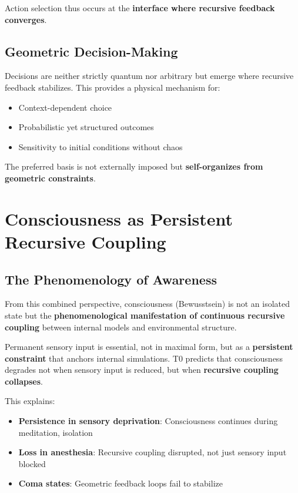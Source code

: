 	Action selection thus occurs at the \textbf{interface where recursive feedback converges}.
	
	\subsection{Geometric Decision-Making}
	
	Decisions are neither strictly quantum nor arbitrary but emerge where recursive feedback stabilizes. This provides a physical mechanism for:
	
	\begin{itemize}
		\item Context-dependent choice
		\item Probabilistic yet structured outcomes
		\item Sensitivity to initial conditions without chaos
	\end{itemize}
	
	The preferred basis is not externally imposed but \textbf{self-organizes from geometric constraints}.
	
	\section{Consciousness as Persistent Recursive Coupling}
	
	\subsection{The Phenomenology of Awareness}
	
	From this combined perspective, consciousness (Bewusstsein) is not an isolated state but the \textbf{phenomenological manifestation of continuous recursive coupling} between internal models and environmental structure.
	
	Permanent sensory input is essential, not in maximal form, but as a \textbf{persistent constraint} that anchors internal simulations. T0 predicts that consciousness degrades not when sensory input is reduced, but when \textbf{recursive coupling collapses}.
	
	This explains:
	\begin{itemize}
		\item \textbf{Persistence in sensory deprivation}: Consciousness continues during meditation, isolation
		\item \textbf{Loss in anesthesia}: Recursive coupling disrupted, not just sensory input blocked
		\item \textbf{Coma states}: Geometric feedback loops fail to stabilize
	\end{itemize}
	
